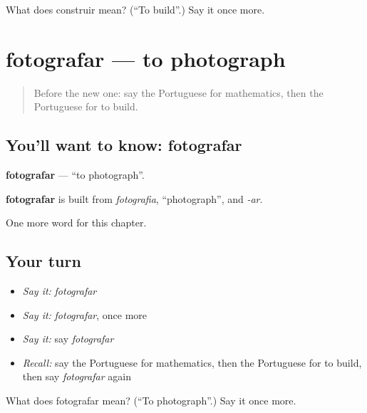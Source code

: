\begin{tcolorbox}[breakable,colback=teal!4,colframe=teal!35!black,title={Before you move on}]
What does construir mean? (\textquotedblleft{}To build\textquotedblright{}.) Say it once more.
\end{tcolorbox}
\section[fotografar]{fotografar — to photograph}

\label{lesson:PT-C231-fotografar}



\begin{quote}
Before the new one: say the Portuguese for mathematics, then the Portuguese for to build.
\end{quote}

\subsection*{You'll want to know: fotografar}
\textbf{fotografar} — \textquotedblleft{}to photograph\textquotedblright{}.

\begin{cousinweb}
\textbf{fotografar} is built from \emph{fotografia}, \textquotedblleft{}photograph\textquotedblright{}, and \emph{-ar}.
\end{cousinweb}

\begin{grammarlens}[title={What you've built}]
One more word for this chapter.
\end{grammarlens}

\subsection*{Your turn}
\begin{itemize}
\raggedright
  \item \emph{Say it:} \emph{fotografar}
  \item \emph{Say it:} \emph{fotografar}, once more
  \item \emph{Say it:} say \emph{fotografar}
  \item \emph{Recall:} say the Portuguese for mathematics, then the Portuguese for to build, then say \emph{fotografar} again
\end{itemize}

\begin{tcolorbox}[breakable,colback=teal!4,colframe=teal!35!black,title={Before you move on}]
What does fotografar mean? (\textquotedblleft{}To photograph\textquotedblright{}.) Say it once more.
\end{tcolorbox}
